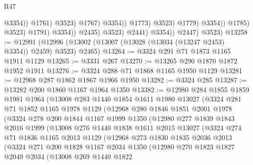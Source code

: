 \begin{lexlean}{R47}
\begin{coremodule}
                                                    @3354))
                                                @1761)
                                              @3523)
                                            @1767)
                                          @3354))
                                      @1773)
                                    @3523)
                                  @1779)
                                @3354))
                            @1785)
                          @3523)
                        @1791)
                      @3354))
                  @2435)
                @3523)
              @2441)
            @3354))
        @2447)
      @3523)
@13258 := @12991 (@12996 (@13002 (@13007 (@13028 (@13034 (@13247 @2453) @3354)) @2459) @3523) @2465)
@13264 := @3324 @291 @71 @1873 @1165 @1911 @1129
@13265 := @3331 @267
@13270 := @13265 @290 @1870 @1872 @1952 @1911
@13276 := @3324 @288 @71 @1868 @1165 @1950 @1129
@13281 := @12968 @287 @1862 @1867 @1966 @1950
@13282 := @3324 @285
@13287 := @13282 @200 @1860 @1167 @1964 @1350
@13382 := @12980
    @284
    @1855
    @1859
    @1981
    @1964
    (@13008
      @283
      @1440
      @1854
      @1611
      @1980
      @13027
      (@3324
        @281
        @71
        @1852
        @1165
        @1978
        @1129
        (@12968
          @280
          @1846
          @1851
          @2001
          @1978
          (@3324
            @278
            @200
            @1844
            @1167
            @1999
            @1350
            (@12980
              @277
              @1839
              @1843
              @2016
              @1999
              (@13008
                @276
                @1440
                @1838
                @1611
                @2015
                @13027
                (@3324
                  @274
                  @71
                  @1836
                  @1165
                  @2013
                  @1129
                  (@12968
                    @273
                    @1830
                    @1835
                    @2036
                    @2013
                    (@3324
                      @271
                      @200
                      @1828
                      @1167
                      @2034
                      @1350
                      (@12980
                        @270
                        @1823
                        @1827
                        @2049
                        @2034
                        (@13008
                          @269
                          @1440
                          @1822

\end{coremodule}
\end{lexlean}
